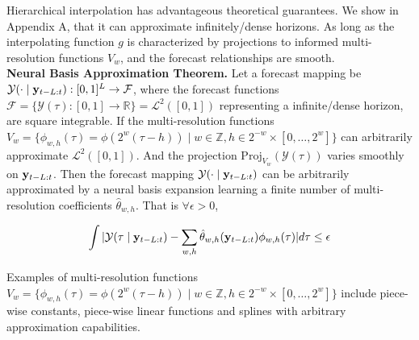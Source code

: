 Hierarchical interpolation has advantageous theoretical guarantees. We show in Appendix A, that it can approximate infinitely/dense horizons. As long as the interpolating function $g$ is characterized by projections to informed multi-resolution functions $V_{w}$, and the forecast relationships are smooth. \\

\textbf{Neural Basis Approximation Theorem.} Let a forecast mapping be $\mathcal{Y}( \cdot \;|\; \mathbf{y}_{t-L:t} ): [0, 1]^L \rightarrow \mathcal{F}$, where the forecast functions $\mathcal{F}=\{\mathcal{Y}(\tau): [0,1] \to \mathbb{R}\}=\mathcal{L}^{2}([0,1])$ representing a infinite/dense horizon, are square integrable. If the multi-resolution functions $V_{w}=\{\phi_{w,h}(\tau) = \phi(2^{w}(\tau-h)) \;|\; w \in {\mathbb{Z}}, h\in2^{-w}\times[0,\dots,2^{w}]\}$ can arbitrarily approximate $\mathcal{L}^{2}([0,1])$. And the projection $\mathrm{Proj}_{V_{w}}(\mathcal{Y}(\tau))$ varies smoothly on $\mathbf{y}_{t-L:t}$. Then the forecast mapping $\mathcal{Y}(\cdot \;|\; \mathbf{y}_{t-L:t})$ can be arbitrarily approximated by a neural basis expansion learning a finite number of  multi-resolution coefficients $\hat{\theta}_{w,h}$. That is $\forall \epsilon>0$,

\begin{equation}
    \int |\mathcal{Y}(\tau \;|\; \mathbf{y}_{t-L:t}) -\sum_{w,h} \hat{\theta}_{w,h}(\mathbf{y}_{t-L:t}) \phi_{w,h}(\tau) | d\tau \leq \epsilon
\end{equation}

Examples of multi-resolution functions $V_{w}=\{\phi_{w,h}(\tau) = \phi(2^{w}(\tau-h)) \;|\; w \in {\mathbb{Z}}, h\in2^{-w}\times[0,\dots,2^{w}]\}$ include piece-wise constants, piece-wise linear functions and splines with arbitrary approximation capabilities.
